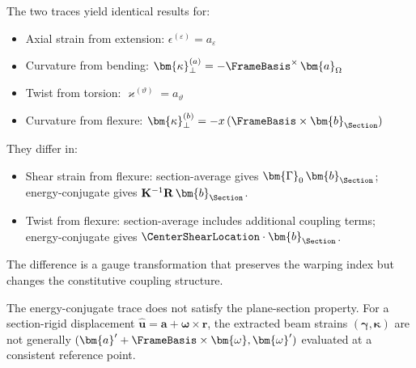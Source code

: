 \begin{remark}
The two traces yield identical results for:
\begin{itemize}
\item Axial strain from extension: $\epsilon^{(\varepsilon)} = a_\varepsilon$
\item Curvature from bending: $\bm{\kappa}_\perp^{(a)} = -\FrameBasis^\times\,\bm{a}_\Omega$
\item Twist from torsion: $\varkappa^{(\vartheta)} = a_\vartheta$
\item Curvature from flexure: $\bm{\kappa}_\perp^{(b)} = -x\,(\FrameBasis \times \bm{b}_{\Section})$
\end{itemize}
They differ in:
\begin{itemize}
\item Shear strain from flexure: section-average gives $\bm{\Gamma}_0\,\bm{b}_{\Section}$; 
energy-conjugate gives $\mathbf{K}^{-1}\mathbf{R}\,\bm{b}_{\Section}$.
\item Twist from flexure: section-average includes additional coupling terms; 
energy-conjugate gives $\CenterShearLocation \cdot \bm{b}_{\Section}$.
\end{itemize}
The difference is a gauge transformation that preserves the warping index 
but changes the constitutive coupling structure.
\end{remark}

\begin{remark}
The energy-conjugate trace does not satisfy the plane-section property. 
For a section-rigid displacement $\hat{\bm{u}} = \bm{a} + \bm{\omega} \times \bm{r}$, 
the extracted beam strains $(\bm{\gamma}, \bm{\kappa})$ are not generally 
$(\bm{a}' + \FrameBasis \times \bm{\omega}, \bm{\omega}')$ evaluated at a consistent 
reference point. 
\end{remark}